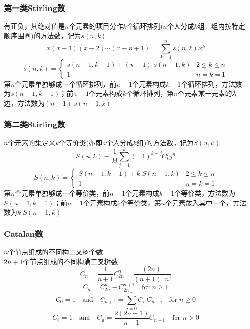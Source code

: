 \subsubsection{第一类Stirling数}
有正负，其绝对值是$n$个元素的项目分作$k$个循环排列($n$个人分成$k$组，组内按特定顺序围圈)的方法数，记为$s(n,k)$
\begin{displaymath}
x(x-1)(x-2)\cdots(x-n+1) = \sum_{k=1}^{n} s(n, k) x^{k}
\end{displaymath}
\begin{displaymath}
s(n, k) = 
\begin{cases}
s(n-1, k-1) + (n-1)\;s(n-1, k) & 2 \leqslant k \leqslant n\\
1 & n=k=1
\end{cases}
\end{displaymath}
第$n$个元素单独够成一个循环排列，前$n-1$个元素构成$k-1$个循环排列，方法数为$s(n-1, k-1)$；前$n-1$个元素构成$k$个循环排列，第$n$个元素某一元素的左边，方法数为$(n-1)\;s(n-1, k)$\\

\subsubsection{第二类Stirling数}
$n$个元素的集定义$k$个等价类(亦即$n$个人分成$k$组)的方法数，记为$S(n,k)$
\begin{displaymath}
S(n, k) = \frac{1}{k!}\sum_{j=1}^{k} (-1)^{k-j} C_{k}^{j} j^{n}
\end{displaymath}
\begin{displaymath}
S(n, k) = 
\begin{cases}
S(n-1, k-1) + k\;S(n-1, k) & 2 \leqslant k \leqslant n\\
1 & n=k=1
\end{cases}
\end{displaymath}
第$n$个元素单独够成一个等价类，前$n-1$个元素构成$k-1$个等价类，方法数为$S(n-1, k-1)$；前$n-1$个元素构成$k$个等价类，第$n$个元素放入其中一个，方法数为$k\;S(n-1, k)$\\

\subsubsection{Catalan数}
$n$个节点组成的不同构二叉树个数\\
$2n+1$个节点组成的不同构满二叉树数
\begin{displaymath}
C_{n} = \frac{1}{n+1} C_{2n}^{n} = \frac{(2n)!}{(n+1)!\;n!}
\end{displaymath}
\begin{displaymath}
C_{n} = C_{2n}^{n} - C_{2n}^{n+1} \quad\mbox{for } n\geqslant 1
\end{displaymath}
\begin{displaymath}
C_{0} = 1 \quad\mbox{and}\quad C_{n+1} = \sum_{i=0}^{n} C_{i}\;C_{n-i} \quad\mbox{for } n\geqslant 0
\end{displaymath}
\begin{displaymath}
C_{0} = 1 \quad\mbox{and}\quad C_{n} = \frac{2(2n-1)}{n+1} C_{n-1} \quad\mbox{for } n>0
\end{displaymath}\\

